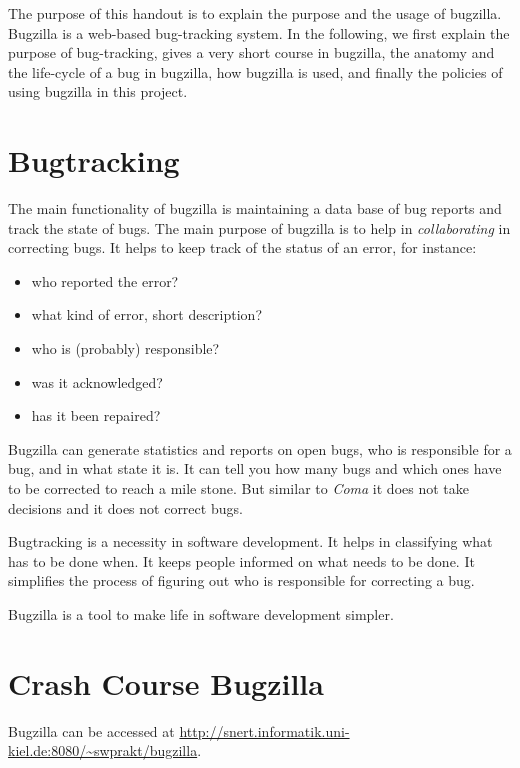 \documentclass[11pt,nologo,handout]{handout}
\newcommand{\Coma}{\textsl{Coma}}
\begin{document}
\thispagestyle{empty}

The purpose of this handout is to explain the purpose and the usage of
bugzilla.  Bugzilla is a web-based bug-tracking system.  In the
following, we first explain the purpose of bug-tracking, gives a very
short course in bugzilla, the anatomy and the life-cycle of a bug in
bugzilla, how bugzilla is used, and finally the policies of using
bugzilla in this project.


\section{Bugtracking}

The main functionality of bugzilla is maintaining a data base of
bug reports and track the state of bugs.  The main purpose of
bugzilla is to help in \emph{collaborating} in correcting bugs.
It helps to keep track of the status of an error, for instance:
\begin{itemize}
\item who reported the error?
\item what kind of error, short description?
\item who is (probably) responsible?
\item was it acknowledged?
\item has it been repaired?
\end{itemize}

Bugzilla can generate statistics and reports on open bugs, who is
responsible for a bug, and in what state it is.  It can tell you
how many bugs and which ones have to be corrected to reach a mile
stone.  But similar to {\Coma} it does not take decisions and it does
not correct bugs.

Bugtracking is a necessity in software development.  It helps in
classifying what has to be done when.  It keeps people informed on
what needs to be done.  It simplifies the process of figuring out
who is responsible for correcting a bug.

Bugzilla is a tool to make life in software development simpler.





\section{Crash Course Bugzilla}

Bugzilla can be accessed at
\url{http://snert.informatik.uni-kiel.de:8080/~swprakt/bugzilla}.
\end{document}
